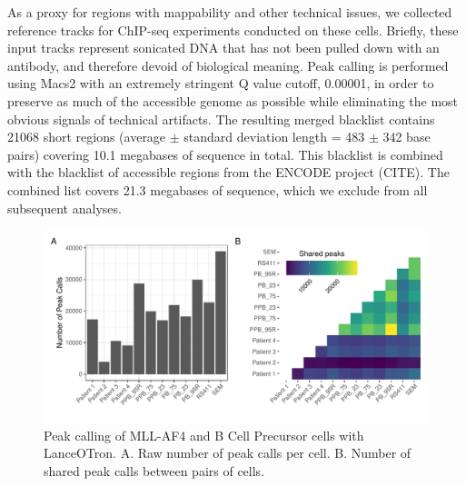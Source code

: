 As a proxy for regions with mappability and other technical issues, we collected reference tracks for ChIP-seq experiments conducted on these cells. 
Briefly, these input tracks represent sonicated DNA that has not been pulled down with an antibody, and therefore devoid of biological meaning.
Peak calling is performed using Macs2 with an extremely stringent Q value cutoff, 0.00001, in order to preserve as much of the accessible genome as possible while eliminating the most obvious signals of technical artifacts. The resulting merged blacklist contains 21068 short regions (average $\pm$ standard deviation length = 483 $\pm$ 342 base pairs) covering 10.1 megabases of sequence in total. This blacklist is combined with the blacklist of accessible regions from the ENCODE project (CITE). The combined list covers 21.3 megabases of sequence, which we exclude from all subsequent analyses.

\begin{figure}
    \centering
    \includegraphics[width=\textwidth]{plot/ch5/mll_redo_shared_peaks.pdf}
    \caption{Peak calling of MLL-AF4 and B Cell Precursor cells with LanceOTron. A. Raw number of peak calls per cell. B. Number of shared peak calls between pairs of cells.}
    \label{fig:mll_peak_calls}
\end{figure}

